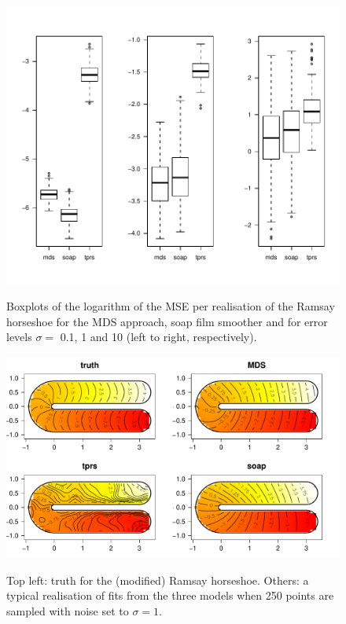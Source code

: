 \begin{figure}
\centering
\includegraphics[width=6in, trim=0in 0.5in 0in 0in]{mds/figs/mds-ramsay-boxplot.pdf} \\
\caption{Boxplots of the logarithm of the MSE per realisation of the Ramsay horseshoe for the MDS approach, soap film smoother and \tprs for error levels $\sigma=$ 0.1, 1 and 10 (left to right, respectively).}
\label{mds-ramsay-boxplot}
\end{figure}

\begin{figure}
\centering
\includegraphics[width=6in]{mds/figs/ramsay-fit-1.pdf} \\
\caption{Top left: truth for the (modified) Ramsay horseshoe. Others: a typical realisation of fits from the three models when 250 points are sampled with noise set to $\sigma=1$.}
\label{mds-ramsay-fit-1}
\end{figure}

